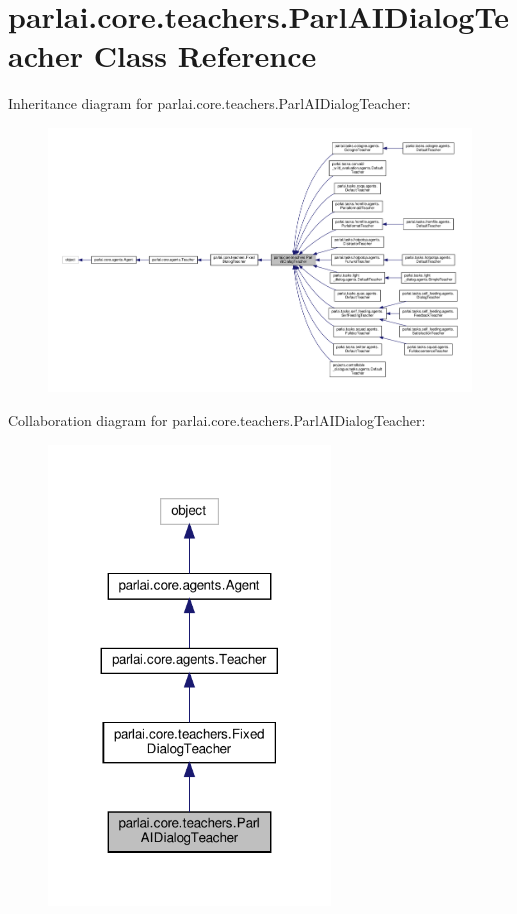 \hypertarget{classparlai_1_1core_1_1teachers_1_1ParlAIDialogTeacher}{}\section{parlai.\+core.\+teachers.\+Parl\+A\+I\+Dialog\+Teacher Class Reference}
\label{classparlai_1_1core_1_1teachers_1_1ParlAIDialogTeacher}


Inheritance diagram for parlai.\+core.\+teachers.\+Parl\+A\+I\+Dialog\+Teacher\+:
\nopagebreak
\begin{figure}[H]
\begin{center}
\leavevmode
\includegraphics[width=350pt]{dc/db2/classparlai_1_1core_1_1teachers_1_1ParlAIDialogTeacher__inherit__graph}
\end{center}
\end{figure}


Collaboration diagram for parlai.\+core.\+teachers.\+Parl\+A\+I\+Dialog\+Teacher\+:
\nopagebreak
\begin{figure}[H]
\begin{center}
\leavevmode
\includegraphics[width=212pt]{da/d3d/classparlai_1_1core_1_1teachers_1_1ParlAIDialogTeacher__coll__graph}
\end{center}
\end{figure}
